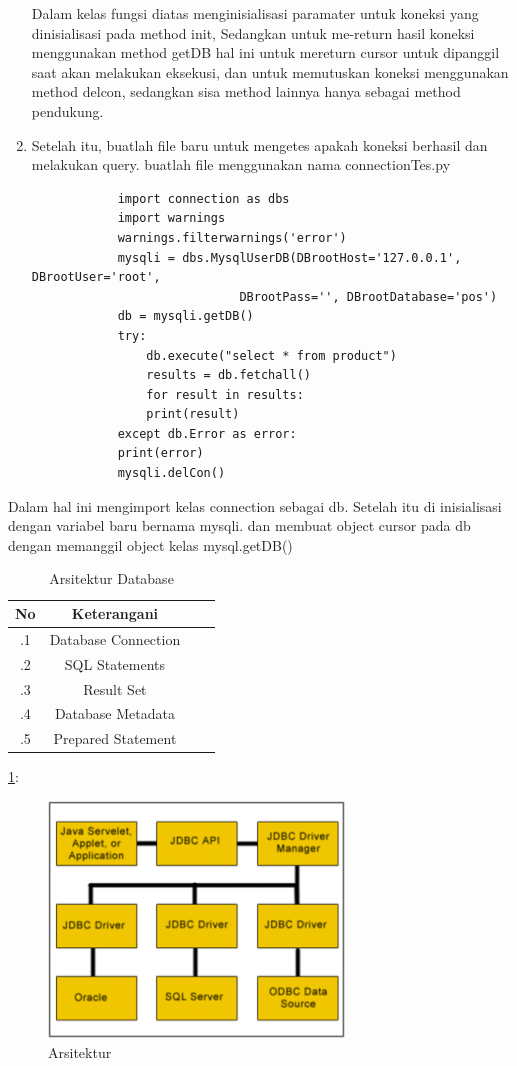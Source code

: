 \begin{enumerate}
Dalam kelas fungsi diatas menginisialisasi paramater untuk koneksi yang dinisialisasi pada method init, 
Sedangkan untuk me-return hasil koneksi menggunakan method getDB hal ini untuk mereturn cursor untuk dipanggil saat akan melakukan eksekusi, dan untuk memutuskan koneksi menggunakan method delcon, sedangkan sisa method lainnya hanya sebagai method pendukung.
	
	\item Setelah itu, buatlah file baru untuk mengetes apakah koneksi berhasil dan melakukan query.
buatlah file menggunakan nama connectionTes.py
		\begin{verbatim}
			import connection as dbs
			import warnings
			warnings.filterwarnings('error')
			mysqli = dbs.MysqlUserDB(DBrootHost='127.0.0.1', DBrootUser='root',
        	                 DBrootPass='', DBrootDatabase='pos')
			db = mysqli.getDB()
			try:
    			db.execute("select * from product")
    			results = db.fetchall()
    			for result in results:
        		print(result)
			except db.Error as error:
	   		print(error)
			mysqli.delCon()
		\end{verbatim}
    \end{enumerate}
Dalam hal ini mengimport kelas connection sebagai db. Setelah itu di inisialisasi dengan variabel baru bernama mysqli.
dan membuat object cursor pada db dengan memanggil object kelas mysql.getDB()

\begin{table}[ht]
	\caption{Arsitektur Database}
	\centering
	\begin{tabular}{cccc}
		\hline
		No&Keterangani&\\
		\hline
		.1&Database Connection&\\
		.2&SQL Statements&\\
		.3&Result Set&\\
		.4&Database Metadata&\\
		.5&Prepared Statement\\
		\hline
	\end{tabular}
\end{table}

\ref{DA.png}:
\begin{figure}[ht]
	\centerline{\includegraphics[width=0.70\textwidth]{figures/DA.png}}
	\caption{Arsitektur}
	\label{DA.png}
\end{figure}
